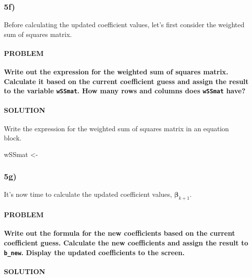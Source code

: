 \documentclass[
]{article}
\newenvironment{Shaded}{\begin{snugshade}}{\end{snugshade}}
\newcommand{\NormalTok}[1]{#1}
\newcommand{\StringTok}[1]{\textcolor[rgb]{0.31,0.60,0.02}{#1}}
\begin{document}
\hypertarget{f-2}{%
\subsubsection{5f)}\label{f-2}}

Before calculating the updated coefficient values, let's first consider
the weighted sum of squares matrix.

\hypertarget{problem-28}{%
\paragraph{PROBLEM}\label{problem-28}}

\textbf{Write out the expression for the weighted sum of squares matrix.
Calculate it based on the current coefficient guess and assign the
result to the variable \texttt{wSSmat}. How many rows and columns does
\texttt{wSSmat} have?}

\hypertarget{solution-27}{%
\paragraph{SOLUTION}\label{solution-27}}

Write the expression for the weighted sum of squares matrix in an
equation block.

\begin{Shaded}
\begin{Highlighting}[]
\NormalTok{wSSmat <-}\StringTok{ }
\end{Highlighting}
\end{Shaded}

\hypertarget{g-1}{%
\subsubsection{5g)}\label{g-1}}

It's now time to calculate the updated coefficient values,
\(\boldsymbol{\beta}_{k+1}\).

\hypertarget{problem-29}{%
\paragraph{PROBLEM}\label{problem-29}}

\textbf{Write out the formula for the new coefficients based on the
current coefficient guess. Calculate the new coefficients and assign the
result to \texttt{b\_new}. Display the updated coefficients to the
screen.}

\hypertarget{solution-28}{%
\paragraph{SOLUTION}\label{solution-28}}
\end{document}
